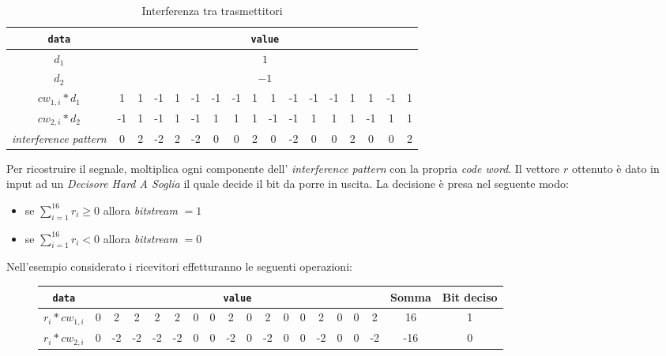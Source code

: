 \documentclass[a4paper,12pt]{article}
\begin{document}
    \begin{table}[H]
      \centering
      \begin{tabular}{| c | c | c | c | c | c | c | c | c | c | c | c | c | c | c | c | c |}\hline
        \texttt{data} & \multicolumn{16}{|c|}{\texttt{value}} \\ \hline
        $d_1$ & \multicolumn{16}{|c|}{$1$} \\ \hline
        $d_2$ & \multicolumn{16}{|c|}{$-1$}\\ \hline
        $cw_{1,i} * d_1$ &1&1&-1&1&-1&-1&-1&1&1&-1&-1&-1&1&1&-1&1 \\ \hline
        $cw_{2,i} * d_2$ &-1&1&-1&1&-1&1&1&1&-1&-1&1&1&1&-1&1&1 \\ \hline
        \textit{interference pattern} &0&2&-2&2&-2&0&0&2&0&-2&0&0&2&0&0&2 \\ \hline
      \end{tabular}
      \caption{Interferenza tra trasmettitori}
      \label{tab:interference pattern}
    \end{table}

    Per ricostruire il segnale, moltiplica ogni componente dell' \textit{interference pattern} con la propria \textit{code
    word}. Il vettore $r$ ottenuto è dato in input ad un \textit{Decisore Hard A Soglia} il quale decide il bit da porre in 
    uscita. La decisione è presa nel seguente modo:

    \begin{itemize}
      \item se $\sum\limits_{i=1}^{16} r_i \geq 0 $ allora \textit{bitstream} $= 1$
      \item se $\sum\limits_{i=1}^{16} r_i < 0 $ allora \textit{bitstream} $= 0$
    \end{itemize}

    Nell'esempio considerato i ricevitori effetturanno le seguenti operazioni:

    \begin{figure}[H]
      \centering
      \begin{tabular}{| c | c | c | c | c | c | c | c | c | c | c | c | c | c | c | c | c | c | c |}\hline
        \texttt{data} & \multicolumn{16}{|c|}{\texttt{value}} & Somma & Bit deciso\\ \hline
        $r_i * cw_{1,i}$ &0&2&2&2&2&0&0&2&0&2&0&0&2&0&0&2&16&1 \\ \hline
        $r_i * cw_{2,i}$ &0&-2&-2&-2&-2&0&0&-2&0&-2&0&0&-2&0&0&-2&-16&0 \\ \hline
      \end{tabular}
      \label{tab:Decisore}
    \end{figure}
\end{document}
